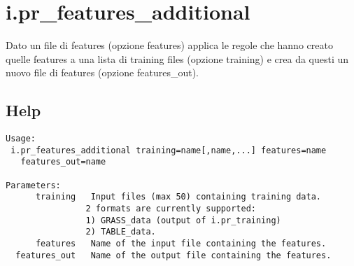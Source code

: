 \section*{i.pr\_features\_additional}
Dato un file di features (opzione features) applica le regole che
hanno creato quelle features a una lista di training files (opzione
training) e crea da questi un nuovo file di features (opzione
features\_out).

\subsection*{Help}
\begin{verbatim}
Usage:
 i.pr_features_additional training=name[,name,...] features=name
   features_out=name

Parameters:
      training   Input files (max 50) containing training data.
                2 formats are currently supported:
                1) GRASS_data (output of i.pr_training)
                2) TABLE_data.
      features   Name of the input file containing the features.
  features_out   Name of the output file containing the features.
\end{verbatim}



